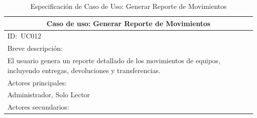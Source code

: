 \documentclass[stu, 12pt, letterpaper, donotrepeattitle, floatsintext, natbib]{apa7}
\begin{document}
\begin{longtable}{@{} p{16.5cm} @{}}
    \caption{Especificación de Caso de Uso: Generar Reporte de Movimientos}\label{tab:UC012}                                                                                                                                                                                       \\ \toprule
    \multicolumn{1}{c}{Caso de uso: Generar Reporte de Movimientos}                                                                                                                                                                                                                \\ \midrule
    ID:~UC012                                                                                                                                                                                                                                                                      \\ \midrule
    Breve descripción:                                                                                                                                                                                                                                                             \\
    El usuario genera un reporte detallado de los movimientos de equipos, incluyendo entregas, devoluciones y transferencias.                                                                                                                                                      \\ \midrule
    Actores principales:                                                                                                                                                                                                                                                           \\
    Administrador, Solo Lector                                                                                                                                                                                                                                                     \\ \midrule
    Actores secundarios:                                                                                                                                                                                                                                                           \\

\end{longtable}
\end{document}
